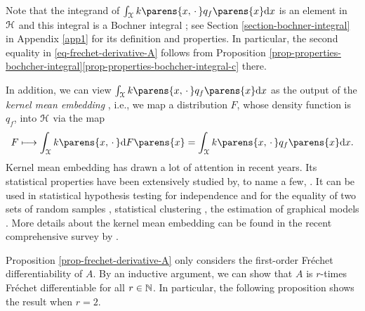 \begin{remark}
	Note that the integrand of $\int_{\calX} k \parens{x, \,\cdot\,} q_f \parens{x} \diff x$ is an element in $\mathcal{H}$ and this integral is a Bochner integral \parencite{Diestel1977-bt, Denkowski2013-ke}; see Section \ref{section-bochner-integral} in Appendix \ref{app1} for its definition and properties. In particular, the second equality in \eqref{eq-frechet-derivative-A} follows from Proposition \ref{prop-properties-bochcher-integral}\ref{prop-properties-bochcher-integral-c} there. 
	
	In addition, we can view $\int_{\calX} k \parens{x, \,\cdot\,} q_f \parens{x} \diff x$ as the output of the \textit{kernel mean embedding} \parencite{bertinetThomas04RKHS, hilbert-embedding-2007}, i.e., we map a distribution $F$, whose density function is $q_f$, into $\mathcal{H}$ via the map 
	\begin{align*}
		F \longmapsto \int_{\calX} k \parens{x, \,\cdot\,} \diff F \parens{x} = \int_{\calX} k \parens{x, \,\cdot\,} q_f \parens{x} \diff x. 
	\end{align*}
	Kernel mean embedding has drawn a lot of attention in recent years. Its statistical properties have been extensively studied by, to name a few, \textcites{Le2008-dl, Sriperumbudur2010-ug, Sriperumbudur2011-db, kernel-mean-estimator-muandet}. It can be used in statistical hypothesis testing for independence \parencites{Gretton2005-tj} and for the equality of two sets of random samples \parencites{Gretton2012-zi}, statistical clustering \parencites{Jegelka2009-an}, the estimation of graphical models \parencites{Song2010-ea, Song2013-ha, Song2014-pi}. More details about the kernel mean embedding can be found in the recent comprehensive survey by \textcites{kernel-mean-embedding-survey-muandet}. 
\end{remark}

Proposition \ref{prop-frechet-derivative-A} only considers the first-order Fr{\'e}chet differentiability of $A$. By an inductive argument, we can show that $A$ is $r$-times Fr{\'e}chet differentiable for all $r \in \mathbb{N}$. In particular, the following proposition shows the result when $r = 2$. 

